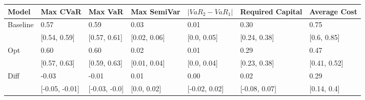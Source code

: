 \begin{tabular}{lllllll}
\toprule
   Model &       Max CVaR &       Max VaR &  Max SemiVar & $|VaR_2 - VaR_1|$ & Required Capital & Average Cost \\
\midrule
Baseline &           0.57 &          0.59 &         0.03 &              0.01 &             0.30 &         0.75 \\
         &   [0.54, 0.59] &  [0.57, 0.61] & [0.02, 0.06] &       [0.0, 0.05] &     [0.24, 0.38] &  [0.6, 0.85] \\
     Opt &           0.60 &          0.60 &         0.02 &              0.01 &             0.29 &         0.47 \\
         &   [0.57, 0.63] &  [0.59, 0.63] & [0.01, 0.04] &       [0.0, 0.04] &     [0.23, 0.38] & [0.41, 0.52] \\
    Diff &          -0.03 &         -0.01 &         0.01 &              0.00 &             0.02 &         0.29 \\
         & [-0.05, -0.01] & [-0.03, -0.0] &  [0.0, 0.02] &     [-0.02, 0.02] &    [-0.08, 0.07] &  [0.14, 0.4] \\
\bottomrule
\end{tabular}
